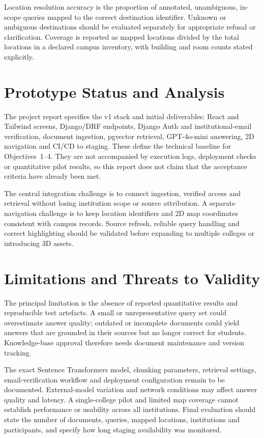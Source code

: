 \documentclass{tietreport}
\begin{document}
Location resolution accuracy is the proportion of annotated, unambiguous,
in-scope queries mapped to the correct destination identifier. Unknown or
ambiguous destinations should be evaluated separately for appropriate refusal
or clarification. Coverage is reported as mapped locations divided by the total
locations in a declared campus inventory, with building and room counts stated
explicitly.

\section{Prototype Status and Analysis}

The project report specifies the v1 stack and initial deliverables: React and
Tailwind screens, Django/DRF endpoints, Django Auth and institutional-email
verification, document ingestion, pgvector retrieval, GPT-4o-mini answering,
2D navigation and CI/CD to staging. These define the technical baseline for
Objectives~1--4. They are not accompanied by execution logs, deployment checks
or quantitative pilot results, so this report does not claim that the
acceptance criteria have already been met.

The central integration challenge is to connect ingestion, verified access and
retrieval without losing institution scope or source attribution. A separate
navigation challenge is to keep location identifiers and 2D map coordinates
consistent with campus records. Source refresh, reliable query handling and
correct highlighting should be validated before expanding to multiple colleges
or introducing 3D assets.

\section{Limitations and Threats to Validity}

The principal limitation is the absence of reported quantitative results and
reproducible test artefacts. A small or unrepresentative query set could
overestimate answer quality; outdated or incomplete documents could yield
answers that are grounded in their sources but no longer correct for students.
Knowledge-base approval therefore needs document maintenance and version tracking.

The exact Sentence Transformers model, chunking parameters, retrieval settings,
email-verification workflow and deployment configuration remain to be documented.
External-model variation and network conditions may affect answer quality and
latency. A single-college pilot and limited map coverage cannot establish
performance or usability across all institutions. Final evaluation should state
the number of documents, queries, mapped locations, institutions and participants,
and specify how long staging availability was monitored.
\end{document}
